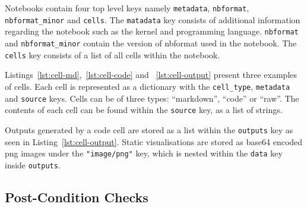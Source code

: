 \documentclass[conference]{IEEEtran}
\begin{document}
Notebooks contain four top level keys namely \texttt{metadata},
\texttt{nbformat}, \texttt{nbformat\_minor} and \texttt{cells}. The
\texttt{matadata} key consists of additional information regarding the
notebook such as the kernel and programming
language. \texttt{nbformat} and \texttt{nbformat\_minor} contain the
version of nbformat used in the notebook. The \texttt{cells} key
consists of a list of all cells within the notebook.

Listings~\ref{lst:cell-md},~\ref{lst:cell-code} and
~\ref{lst:cell-output} present three examples of cells. Each cell is
represented as a dictionary with the \texttt{cell\_type},
\texttt{metadata} and \texttt{source} keys. Cells can be of three
types: ``markdown'', ``code'' or ``raw''. The contents of each cell
can be found within the \texttt{source} key, as a list of strings.

Outputs generated by a code cell are stored as a list within the
\texttt{outputs} key as seen in Listing~\ref{lst:cell-output}. Static
visualisations are stored as base64 encoded png images under the
\texttt{"image/png"} key, which is nested within the \texttt{data} key
inside \texttt{outputs}.

\subsection{Post-Condition Checks}\label{sec:post-cond}
\end{document}
